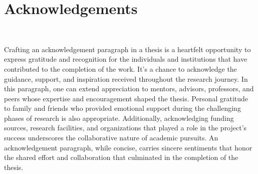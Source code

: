 \section*{Acknowledgements}~\label{sec:acknowledgements}

Crafting an acknowledgement paragraph in a thesis is a heartfelt opportunity to express gratitude and recognition for the individuals and institutions that have contributed to the completion of the work. It's a chance to acknowledge the guidance, support, and inspiration received throughout the research journey. In this paragraph, one can extend appreciation to mentors, advisors, professors, and peers whose expertise and encouragement shaped the thesis. Personal gratitude to family and friends who provided emotional support during the challenging phases of research is also appropriate. Additionally, acknowledging funding sources, research facilities, and organizations that played a role in the project's success underscores the collaborative nature of academic pursuits. An acknowledgement paragraph, while concise, carries sincere sentiments that honor the shared effort and collaboration that culminated in the completion of the thesis.